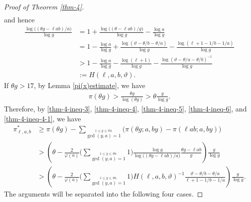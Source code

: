 \documentclass[12pt,a4paper,reqno]{amsart}
\numberwithin{equation}{section}
\theoremstyle{plain}
\theoremstyle{definition}
\begin{document}
\begin{proof}[Proof of Theorem \ref{thm-4}]
\begin{align}
\end{align}
and hence
\begin{align}
	\frac{\log\big((\theta g-\ell ab)/a \big)}{\log g}
	&= 1+\frac{\log\big((\theta-\ell ab)/ g\big)}{\log g}-\frac{\log a}{\log g}\nonumber\\
	&= 1-\frac{\log a}{\log  g}+\frac{\log( \vartheta-\theta/b-\theta/a)}{\log  g}-\frac{\log(\ell+1-1/b-1/a)}{\log  g}\nonumber\\
	&> 1-\frac{\log a}{\log  g}-\frac{\log(\ell+1)}{\log g}-\frac{\log( \vartheta-\theta/a-\theta/b)^{-1}}{\log  g} \label{thm-4-ineq-6}\\
	&:= H(\ell,a,b,\vartheta).\nonumber
\end{align}
If $\theta g>17$, by Lemma \ref{pi(x)estimate}, we have 
\begin{align}\label{thm-4-ineq-4-1}
	\pi(\theta g)>\frac{\theta g}{\log (\theta g)}>\theta \frac{g}{\log g}.
\end{align}
Therefore, by \eqref{thm-4-ineq-3}, \eqref{thm-4-ineq-4}, \eqref{thm-4-ineq-5}, \eqref{thm-4-ineq-6}, and \eqref{thm-4-ineq-4-1}, we have
\begin{align}
	\pi^{*}_{\ell,a,b} 
	&\geq \pi(\theta g)-\sum_{\stackrel{1\leq y\leq \vartheta a}{\gcd(y,a)=1}} \big( \pi(\theta g;a,by)- \pi(\ell ab;a,by)\big)\nonumber\\
	&> \left( \theta -\frac{2}{\varphi(a)}
		\Bigg(\sum_{\stackrel{1\leq y\leq \vartheta a}{\gcd(y,a)=1}}1 \Bigg)
		\frac{\log  g}{\log\big((\theta g-\ell ab)/a \big)} \frac{\theta g-\ell ab}{g}
	\right) \frac{g}{\log g}\nonumber\\
	&> \left( \theta -\frac{2}{\varphi(a)}\Bigg(\sum_{\stackrel{1\leq y\leq \vartheta a}{\gcd(y,a)=1}}1\Bigg) H(\ell,a,b,\vartheta)^{-1} \frac{\vartheta - \theta/b -\theta/a}{\ell+1-1/b-1/a}
\right) \frac{g}{\log g}. \label{thm-4-ineq-7-2}
\end{align}
The arguments will be separated into the following four cases.


\end{proof}
\end{document}
